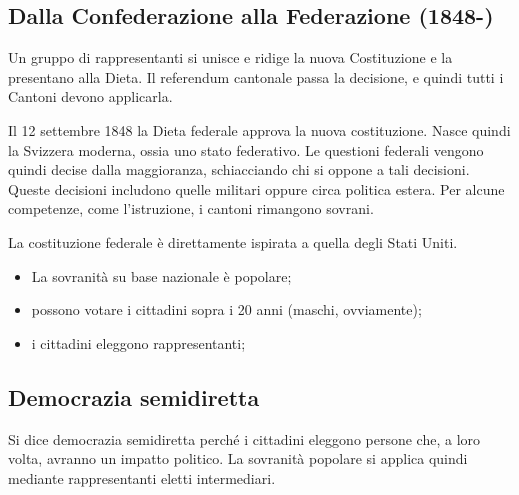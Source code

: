 \documentclass[a4paper]{article}
\begin{document}
\pagebreak

\subsection{Dalla Confederazione alla Federazione (1848-)}

Un gruppo di rappresentanti si unisce e ridige la nuova Costituzione e la presentano alla Dieta.
Il referendum cantonale passa la decisione, e quindi tutti i Cantoni devono applicarla.

Il 12 settembre 1848 la Dieta federale approva la nuova costituzione.
Nasce quindi la Svizzera moderna, ossia uno stato federativo.
Le questioni federali vengono quindi decise dalla maggioranza, schiacciando chi si oppone a tali decisioni.
Queste decisioni includono quelle militari oppure circa politica estera.
Per alcune competenze, come l'istruzione, i cantoni rimangono sovrani.

La costituzione federale è direttamente ispirata a quella degli Stati Uniti.
\begin{itemize}
    \item La sovranità su base nazionale è popolare;
    \item possono votare i cittadini sopra i 20 anni (maschi, ovviamente);
    \item i cittadini eleggono rappresentanti;
\end{itemize}


\subsection{Democrazia semidiretta}

Si dice democrazia semidiretta perché i cittadini eleggono persone che, a loro volta,
avranno un impatto politico.
La sovranità popolare si applica quindi mediante rappresentanti eletti intermediari.
\end{document}
